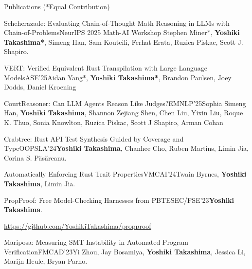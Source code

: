 \documentclass{resume} %
\begin{document}
\begin{rSection}{Publications {\footnotesize (*Equal Contribution)}}

  \begin{rPubsection}{Scheherazade: Evaluating Chain-of-Thought Math
      Reasoning in LLMs with Chain-of-Problems}{NeurIPS 2025 Math-AI Workshop}{
      Stephen Miner*, \textbf{Yoshiki Takashima*}, Simeng Han, Sam
      Kouteili, Ferhat Erata, Ruzica Piskac, Scott J. Shapiro.}{}
  \end{rPubsection}

  \begin{rPubsection}{VERT: Verified Equivalent Rust Transpilation
      with Large Language Models}{ASE'25}{Aidan Yang*,
      \textbf{Yoshiki Takashima*}, Brandon Paulsen, Joey Dodds, Daniel
      Kroening}{}

  \end{rPubsection}
  \begin{rPubsection}{CourtReasoner: Can LLM Agents Reason Like Judges?}{EMNLP'25}{Sophia Simeng
    Han, \textbf{Yoshiki Takashima}, Shannon Zejiang Shen, Chen Liu, Yixin Liu,
    Roque K. Thuo, Sonia Knowlton, Ruzica Piskac, Scott J Shapiro,
    Arman Cohan}{}
  \end{rPubsection}


  \begin{rPubsection}{Crabtree: Rust API Test Synthesis Guided by
      Coverage and Type}{OOPSLA'24}{\textbf{Yoshiki
        Takashima}, Chanhee Cho, Ruben Martins, Limin Jia, Corina
      S. P\u{a}s\u{a}reanu.}{}
  \end{rPubsection}

  \begin{rPubsection}{Automatically Enforcing Rust Trait
      Properties}{VMCAI'24}{Twain Byrnes, \textbf{Yoshiki Takashima}, Limin
      Jia.}{}
  \end{rPubsection}

  \begin{rPubsection}{PropProof: Free Model-Checking Harnesses from
      PBT}{ESEC/FSE’23}{\textbf{Yoshiki Takashima}.}{}

    {\footnotesize
      \href{https://github.com/YoshikiTakashima/propproof}
      {https://github.com/YoshikiTakashima/propproof}}
  \end{rPubsection}

  \begin{rPubsection}{Mariposa: Measuring SMT Instability in Automated
      Program Verification}{FMCAD'23}{Yi Zhou, Jay Bosamiya, \textbf{Yoshiki
      Takashima}, Jessica Li, Marijn Heule, Bryan Parno.}{}


\end{rPubsection}
\end{rSection}
\end{document}
